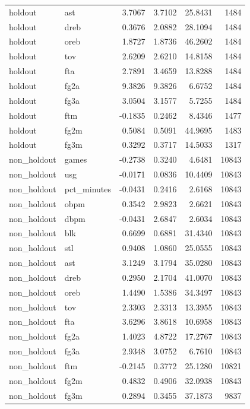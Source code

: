 \begin{table}
\begin{tabular}{llrrrr}
holdout & ast & 3.7067 & 3.7102 & 25.8431 & 1484 \\
holdout & dreb & 0.3676 & 2.0882 & 28.1094 & 1484 \\
holdout & oreb & 1.8727 & 1.8736 & 46.2602 & 1484 \\
holdout & tov & 2.6209 & 2.6210 & 14.8158 & 1484 \\
holdout & fta & 2.7891 & 3.4659 & 13.8288 & 1484 \\
holdout & fg2a & 9.3826 & 9.3826 & 6.6752 & 1484 \\
holdout & fg3a & 3.0504 & 3.1577 & 5.7255 & 1484 \\
holdout & ftm & -0.1835 & 0.2462 & 8.4346 & 1477 \\
holdout & fg2m & 0.5084 & 0.5091 & 44.9695 & 1483 \\
holdout & fg3m & 0.3292 & 0.3717 & 14.5033 & 1317 \\
non\_holdout & games & -0.2738 & 0.3240 & 4.6481 & 10843 \\
non\_holdout & usg & -0.0171 & 0.0836 & 10.4409 & 10843 \\
non\_holdout & pct\_minutes & -0.0431 & 0.2416 & 2.6168 & 10843 \\
non\_holdout & obpm & 0.3542 & 2.9823 & 2.6621 & 10843 \\
non\_holdout & dbpm & -0.0431 & 2.6847 & 2.6034 & 10843 \\
non\_holdout & blk & 0.6699 & 0.6881 & 31.4340 & 10843 \\
non\_holdout & stl & 0.9408 & 1.0860 & 25.0555 & 10843 \\
non\_holdout & ast & 3.1249 & 3.1794 & 35.0280 & 10843 \\
non\_holdout & dreb & 0.2950 & 2.1704 & 41.0070 & 10843 \\
non\_holdout & oreb & 1.4490 & 1.5386 & 34.3497 & 10843 \\
non\_holdout & tov & 2.3303 & 2.3313 & 13.3955 & 10843 \\
non\_holdout & fta & 3.6296 & 3.8618 & 10.6958 & 10843 \\
non\_holdout & fg2a & 1.4023 & 4.8722 & 17.2767 & 10843 \\
non\_holdout & fg3a & 2.9348 & 3.0752 & 6.7610 & 10843 \\
non\_holdout & ftm & -0.2145 & 0.3772 & 25.1280 & 10821 \\
non\_holdout & fg2m & 0.4832 & 0.4906 & 32.0938 & 10843 \\
non\_holdout & fg3m & 0.2894 & 0.3455 & 37.1873 & 9837 \\
\bottomrule
\end{tabular}
\end{table}

